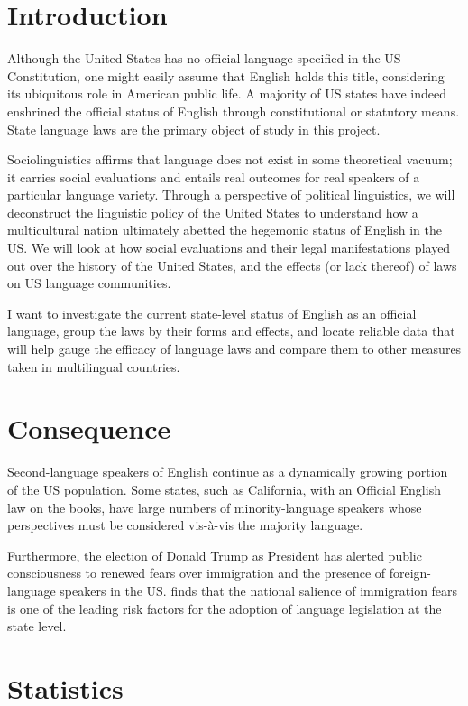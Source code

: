 \documentclass{article}
\begin{document}
\section*{Introduction}

Although the United States has no official language specified in the US
Constitution, one might easily assume that English holds this title, considering
its ubiquitous role in American public life. A majority of US states have indeed
enshrined the official status of English through constitutional or statutory
means. State language laws are the primary object of study in this project.

Sociolinguistics affirms that language does not exist in some theoretical
vacuum; it carries social evaluations and entails real outcomes for real
speakers of a particular language variety. Through a perspective of political
linguistics, we will deconstruct the linguistic policy of the United States to
understand how a multicultural nation ultimately abetted the hegemonic status of
English in the US. We will look at how social evaluations and their legal
manifestations played out over the history of the United States, and the effects
(or lack thereof) of laws on US language communities.

I want to investigate the current state-level status of English as an official
language, group the laws by their forms and effects, and locate reliable data
that will help gauge the efficacy of language laws and compare them to other
measures taken in multilingual countries.

\section*{Consequence}

Second-language speakers of English continue as a dynamically growing portion of
the US population. Some states, such as California, with an Official English law
on the books, have large numbers of minority-language speakers whose
perspectives must be considered vis-à-vis the majority language.

Furthermore, the election of Donald Trump as President has alerted public
consciousness to renewed fears over immigration and the presence of
foreign-language speakers in the US. \textcite{Liu14} finds that the national
salience of immigration fears is one of the leading risk factors for the
adoption of language legislation at the state level.

\section*{Statistics}
\end{document}
